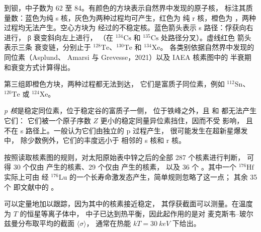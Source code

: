 \begin{omfigure}
{到钡，中子数为 62 至 84。有颜色的方块表示自然界中发现的原子核，
标注其质量数：蓝色为纯 s 核，灰色为两种过程均可产生，红色为
纯 r 核，橙色为 ，两种过程均无法产生。空心方块为 
经过的不稳定核。蓝色箭头表示 s 路径：俘获向右进行，
β 衰变斜向左上进行，
（在 $^{134}\mathrm{Cs}$ 和 $^{135}\mathrm{Cs}$ 处路径分叉）。虚线红色
箭头表示三条 衰变链，分别止于
$^{128}\mathrm{Te}$、$^{130}\mathrm{Te}$ 和 $^{134}\mathrm{Xe}$。
各类别依据自然界中发现的同位素（Asplund、
Amarsi 与 Grevesse，2021）以及 IAEA 核素图中的
半衰期和衰变方式计算得出。}\label{fig:b3:origin-of-elements:chart}
\end{omfigure}

第三组即橙色方块，两种过程都无法到达，
它们是富质子同位素，例如 $^{112}\mathrm{Sn}$、$^{120}\mathrm{Te}$
或 $^{124}\mathrm{Xe}$。

\begin{definition}[p 核]\label{def:b3:origin-of-elements:p-process}
\emph{p 核}是稳定同位素，位于稳定谷的富质子一侧，
位于铁峰之外，且 和 都无法产生它们：
它们被一个原子序数 $Z$ 更小的稳定同量异位素挡住，因而不受 影响，
且不在 s 路径上。一般认为它们由独立的 p 过程产生，
很可能发生在超新星爆发中，
除少数例外，它们的丰度远小于
相邻的 s 核和 r 核。
\end{definition}

按照读取核素图的规则，对太阳原始表中锌之后的全部 287 个核素进行判断，
可得 30 个仅由 产生的核素、29 个仅由 产生的核素，
以及 36 个 。其中一个  $^{176}\mathrm{Hf}$ 实际上可由 
经 $^{176}\mathrm{Lu}$ 的一个长寿命激发态产生，简单规则忽略了这一点；
其余 35 个
即文献中的 。

可以定量地加以跟踪，因为其中的核素接近稳定，
其俘获截面可以测量。在温度为 $T$ 的恒星等离子体中，
中子已达到热平衡，因此起作用的是对
麦克斯韦–玻尔兹曼分布取平均的截面 $\langle\sigma\rangle$，
通常在热能
$kT = \qty{30}{keV}$ 下给出。

